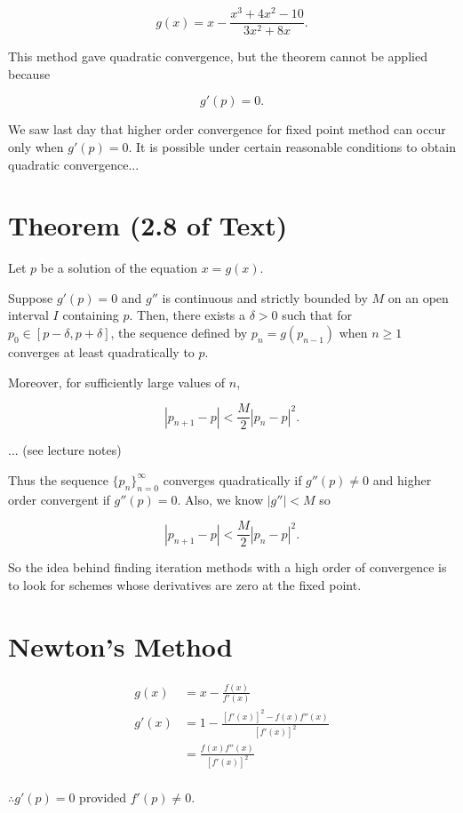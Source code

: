 \documentclass[12pt]{article}
\begin{document}
\[
g(x) = x-\frac{x^3+4x^2-10}{3x^2+8x}
.\]

This method gave quadratic convergence, but the theorem cannot be applied 
because

\[
g'(p) = 0
.\]

We saw last day that higher order convergence for fixed point method can 
occur only when $g'(p) = 0$. It is possible under certain reasonable conditions
to obtain quadratic convergence...

\section{Theorem (2.8 of Text)}

Let $p$ be a solution of the equation $x = g(x)$.

Suppose $g'(p) = 0$ and $g''$ is continuous and strictly bounded by $M$ on an
open interval $I$ containing $p$. Then, there exists a $\delta > 0$ such that
for $p_0 \in [p-\delta, p+\delta]$, the sequence defined by $p_n = g(p_{n-1})$
when $n\geq 1$ converges at least quadratically to $p$.

Moreover, for sufficiently large values of $n$, 

\[
|p_{n+1} - p| < \frac{M}{2} |p_n - p|^2
.\]

\proof... (see lecture notes)

Thus the sequence $\{ p_n \}_{n=0}^\infty$ converges quadratically if
$g''(p) \neq 0$ and higher order convergent if $g''(p) = 0$. Also, we know
$|g''| < M $ so 

\[
|p_{n+1} - p| < \frac{M}{2} |p_n - p|^2
.\]

So the idea behind finding iteration methods with a high order of convergence
is to look for schemes whose derivatives are zero at the fixed point.

\section{Newton's Method}

\begin{align*}
  g(x) &= x-\frac{f(x)}{f'(x)} \\
  g'(x) &= 1-\frac{[f'(x)]^2 - f(x) f''(x)}{[f'(x)]^2} \\
        &= \frac{f(x)f''(x)}{[f'(x)]^2} \\
\end{align*}

$\therefore g'(p) = 0$ provided $f'(p) \neq 0$.
\end{document}
